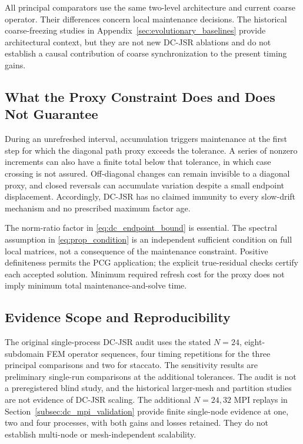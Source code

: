 \documentclass[preprint,12pt,3p]{elsarticle}
\begin{document}
All principal comparators use the same two-level architecture and current
coarse operator. Their differences concern local maintenance decisions.
The historical coarse-freezing studies in
Appendix~\ref{sec:evolutionary_baselines} provide architectural context, but
they are not new DC-JSR ablations and do not establish a causal contribution
of coarse synchronization to the present timing gains.

\subsection{What the Proxy Constraint Does and Does Not Guarantee}
During an unrefreshed interval, accumulation triggers maintenance at the first
step for which the diagonal path proxy exceeds the tolerance. A series of
nonzero increments can also have a finite total below that tolerance, in
which case crossing is not assured. Off-diagonal changes can remain invisible
to a diagonal proxy, and closed reversals can accumulate variation despite
a small endpoint displacement. Accordingly, DC-JSR has no claimed immunity
to every slow-drift mechanism and no prescribed maximum factor age.

The norm-ratio factor in \eqref{eq:dc_endpoint_bound} is essential.
The spectral assumption in \eqref{eq:prop_condition} is an independent
sufficient condition on full local matrices, not a consequence of the
maintenance constraint. Positive definiteness permits the PCG application;
the explicit true-residual checks certify each accepted solution.
Minimum required refresh cost for the proxy does not imply minimum total
maintenance-and-solve time.

\subsection{Evidence Scope and Reproducibility}
The original single-process DC-JSR audit uses the stated $N=24$, eight-subdomain FEM
operator sequences, four timing repetitions for the three principal
comparisons and two for staccato. The sensitivity results are preliminary
single-run comparisons at the additional tolerances. The audit is not a
preregistered blind study, and the historical larger-mesh and partition
studies are not evidence of DC-JSR scaling. The additional $N=24,32$ MPI
replays in Section~\ref{subsec:dc_mpi_validation} provide finite single-node
evidence at one, two and four processes, with both gains and losses retained.
They do not establish multi-node or mesh-independent scalability.
\end{document}
